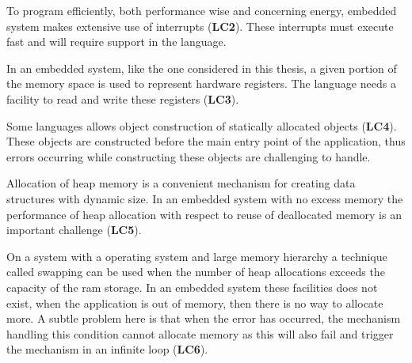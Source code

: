 To program efficiently, both performance wise and concerning energy, embedded system makes extensive use of interrupts (\textbf{LC2}).
These interrupts must execute fast and will require support in the language.

In an embedded system, like the one considered in this thesis, a given portion of the memory space is used to represent hardware registers.
The language needs a facility to read and write these registers (\textbf{LC3}).

Some languages allows object construction of statically allocated objects (\textbf{LC4}).
These objects are constructed before the main entry point of the application, thus errors occurring while constructing these objects are challenging to handle.

Allocation of heap memory is a convenient mechanism for creating data structures with dynamic size.
In an embedded system with no excess memory the performance of heap allocation with respect to reuse of deallocated memory is an important challenge (\textbf{LC5}).

On a system with a operating system and large memory hierarchy a technique called swapping can be used when the number of heap allocations exceeds the capacity of the \gls{ram} storage.
In an embedded system these facilities does not exist, when the application is out of memory, then there is no way to allocate more.
A subtle problem here is that when the error has occurred, the mechanism handling this condition cannot allocate memory as this will also fail and trigger the mechanism in an infinite loop (\textbf{LC6}).
